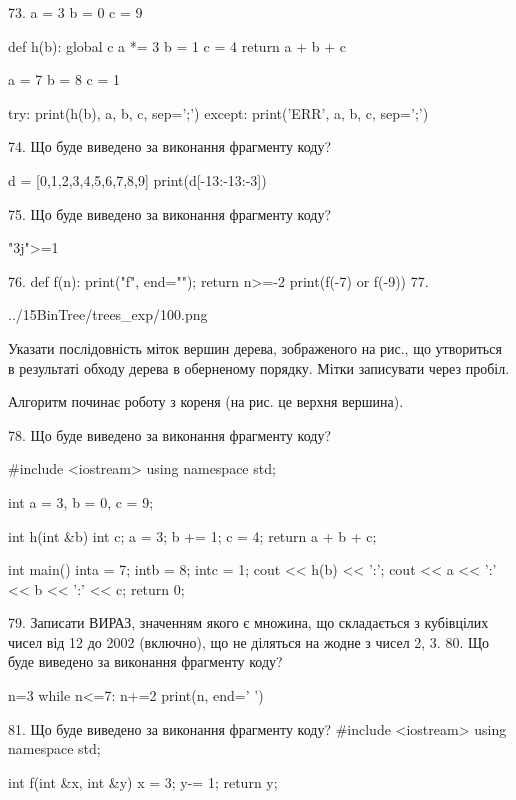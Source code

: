 \documentclass[11pt]{article}
\begin{document}
{%
73. 
a = 3
b = 0
c = 9

def h(b):
global c    a *= 3
    b = 1
    c = 4
    return a + b + c

a = 7
b = 8
c = 1

try:
    print(h(b), a, b, c, sep=';')
except:
    print('ERR', a, b, c, sep=';')

74. Що буде виведено за виконання фрагменту коду?

d = [0,1,2,3,4,5,6,7,8,9]
print(d[-13:-13:-3])


75. Що буде виведено за виконання фрагменту коду?

"3j">=1

76. 
def f(n): print("f", end=""); return n>=-2
   print(f(-7) or f(-9))
77. 

\begin{center}
	{../15BinTree/trees_exp/100.png}
\end{center}
Указати послідовність міток вершин дерева, зображеного на рис., що утвориться в результаті обходу дерева в оберненому порядку. Мітки записувати через пробіл.\par Алгоритм починає роботу з кореня (на рис. це верхня вершина).

78. Що буде виведено за виконання фрагменту коду?

#include <iostream>
using namespace std;

int a = 3, b = 0, c = 9;

int h(int &b){
int c;    a = 3;
    b += 1;
    c = 4;
    return a + b + c;
}

int main(){
    inta = 7;
    intb = 8;
    intc = 1;
    cout << h(b) << ':';
    cout << a << ':' << b << ':' << c;
    return 0; 
}

79. 
Записати ВИРАЗ, значенням якого є множина, що складається з кубівцілих чисел від 12 до 2002 (включно), що не діляться на жодне з чисел 2, 3.
80. Що буде виведено за виконання фрагменту коду?

n=3
while n<=7:
    n+=2
print(n, end=' ')


81. Що буде виведено за виконання фрагменту коду?
#include <iostream>
using namespace std;

int f(int &x, int &y){
    x = 3;
    y-= 1;
    return y;
}

}
\end{document}
